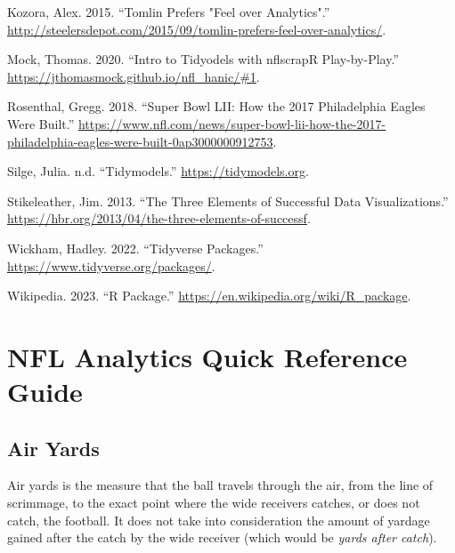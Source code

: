 \documentclass[
  letterpaper,
]{krantz}
\newlength{\cslhangindent}
\newlength{\cslentryspacingunit} %
\newenvironment{CSLReferences}[2] %
 {%
  \setlength{\parindent}{0pt}
  \ifodd #1
  \let\oldpar\par
  \def\par{\hangindent=\cslhangindent\oldpar}
  \fi
  \setlength{\parskip}{#2\cslentryspacingunit}
 }%
 {}
\begin{document}
\begin{CSLReferences}{1}{0}
\leavevmode{}%
Kozora, Alex. 2015. {``Tomlin Prefers "Feel over Analytics".''}
\url{http://steelersdepot.com/2015/09/tomlin-prefers-feel-over-analytics/}.

\leavevmode{}%
Mock, Thomas. 2020. {``Intro to Tidyodels with nflscrapR
Play-by-Play.''} \url{https://jthomasmock.github.io/nfl_hanic/\#1}.

\leavevmode{}%
Rosenthal, Gregg. 2018. {``Super Bowl LII: How the 2017 Philadelphia
Eagles Were Built.''}
\url{https://www.nfl.com/news/super-bowl-lii-how-the-2017-philadelphia-eagles-were-built-0ap3000000912753}.

\leavevmode{}%
Silge, Julia. n.d. {``Tidymodels.''} \url{https://tidymodels.org}.

\leavevmode{}%
Stikeleather, Jim. 2013. {``The Three Elements of Successful Data
Visualizations.''}
\url{https://hbr.org/2013/04/the-three-elements-of-successf}.

\leavevmode{}%
Wickham, Hadley. 2022. {``Tidyverse Packages.''}
\url{https://www.tidyverse.org/packages/}.

\leavevmode{}%
Wikipedia. 2023. {``R Package.''}
\url{https://en.wikipedia.org/wiki/R_package}.

\end{CSLReferences}

\cleardoublepage
{}
{}
\appendix

\hypertarget{sec-appendix-starting}{%
\chapter{NFL Analytics Quick Reference
Guide}\label{sec-appendix-starting}}

\hypertarget{air-yards}{%
\section{Air Yards}\label{air-yards}}

Air yards is the measure that the ball travels through the air, from the
line of scrimmage, to the exact point where the wide receivers catches,
or does not catch, the football. It does not take into consideration the
amount of yardage gained after the catch by the wide receiver (which
would be \emph{yards after catch}).
\end{document}
